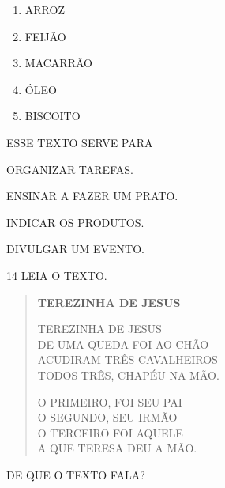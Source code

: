 \begin{myquote}
\begin{enumerate}
\item ARROZ

\item FEIJÃO

\item MACARRÃO

\item ÓLEO

\item BISCOITO



\end{enumerate}
\end{myquote}

ESSE TEXTO SERVE PARA

\begin{escolha}
\item ORGANIZAR TAREFAS.

\item ENSINAR A FAZER UM PRATO.

\item INDICAR OS PRODUTOS.

\item DIVULGAR UM EVENTO.
\end{escolha}

\num{14} LEIA O TEXTO. \enlargethispage{2\baselineskip}

\begin{myquote}
\begin{verse}
\textbf{TEREZINHA DE JESUS}

TEREZINHA DE JESUS\\
DE UMA QUEDA FOI AO CHÃO\\
ACUDIRAM TRÊS CAVALHEIROS\\
TODOS TRÊS, CHAPÉU NA MÃO.


O PRIMEIRO, FOI SEU PAI\\
O SEGUNDO, SEU IRMÃO\\
O TERCEIRO FOI AQUELE\\
A QUE TERESA DEU A MÃO.

\end{verse}
\end{myquote}

DE QUE O TEXTO FALA?

